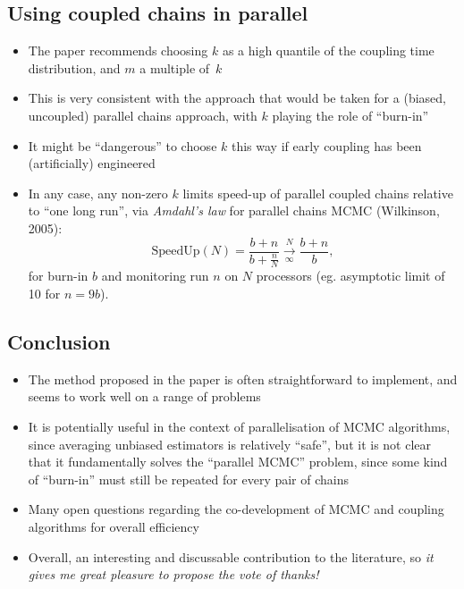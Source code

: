 \documentclass[11pt,a4paper]{article}
\begin{document}
  \subsection{Using coupled chains in parallel}
  \begin{itemize}
  \item The paper recommends choosing $k$ as a high quantile of the coupling time distribution, and $m$ a multiple of~$k$
  \item This is very consistent with the approach that would be taken for a (biased, uncoupled) parallel chains approach, with $k$ playing the role of ``burn-in''
  \item It might be ``dangerous'' to choose $k$ this way if early coupling has been (artificially) engineered
  \item In any case, any non-zero $k$ limits speed-up of parallel coupled chains relative to ``one long run'', via \emph{Amdahl's law} for parallel chains MCMC (Wilkinson, 2005):
    \[
\text{SpeedUp}(N) = \frac{b+n}{b+\frac{n}{N}} \overset{N}{\underset{\infty}{\longrightarrow}} \frac{b+n}{b},
    \]
    for burn-in $b$ and monitoring run $n$ on $N$ processors (eg. asymptotic limit of 10 for $n=9b$).
    \end{itemize}



  \subsection{Conclusion}
  \begin{itemize}
  \item The method proposed in the paper is often straightforward to implement, and seems to work well on a range of problems
  \item It is potentially useful in the context of parallelisation of MCMC algorithms, since averaging unbiased estimators is relatively ``safe'', but it is not clear that it fundamentally solves the ``parallel MCMC'' problem, since some kind of ``burn-in'' must still be repeated for every pair of chains
  \item Many open questions regarding the co-development of MCMC and coupling algorithms for overall efficiency
  \item Overall, an interesting and discussable contribution to the literature, so \emph{it gives me great pleasure to propose the vote of thanks!}
  \end{itemize}
\end{document}
